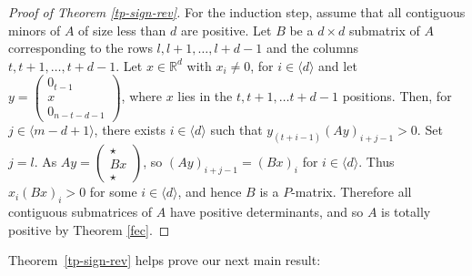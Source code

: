 \documentclass[11pt]{article}
\begin{document}
\begin{proof}[Proof of Theorem \ref{tp-sign-rev}]
    For the induction step, assume that all contiguous minors of $A$ of size less than $d$ are positive. Let $B$ be a $d\times d$ submatrix of $A$ corresponding to the rows $l, l+1,\dots,l+d-1$ and the columns $t, t+1,\dots,t+d-1$. Let $x \in \mathbb{R}^d$ with $x_i \neq 0$, for $i \in \langle d \rangle$ and let $y = \begin{pmatrix}0_{t-1}\\x\\0_{n-t-d-1} \end{pmatrix}$, where $x$ lies in the $t,t+1,\ldots t+d-1$ positions. Then, for $j \in \langle m-d+1 \rangle$, there exists $i \in \langle d \rangle$ such that $y_{(t+i-1)}(Ay)_{i+j-1} > 0$. Set $j = l$. As $Ay = \begin{pmatrix}\star\\ Bx\\ \star \end{pmatrix}$,
    so $(Ay)_{i+j-1}=(Bx)_i$ for $i\in \langle d \rangle$. Thus
    $x_{i}(Bx)_{i} > 0$ for some $i\in \langle d \rangle$, and hence
    $B $ is a $P$-matrix. Therefore all contiguous submatrices of $A$ have
    positive determinants, and so $A$ is totally positive by Theorem
    \ref{fec}.
\end{proof}

Theorem~\ref{tp-sign-rev} helps prove our next main result:
\end{document}
